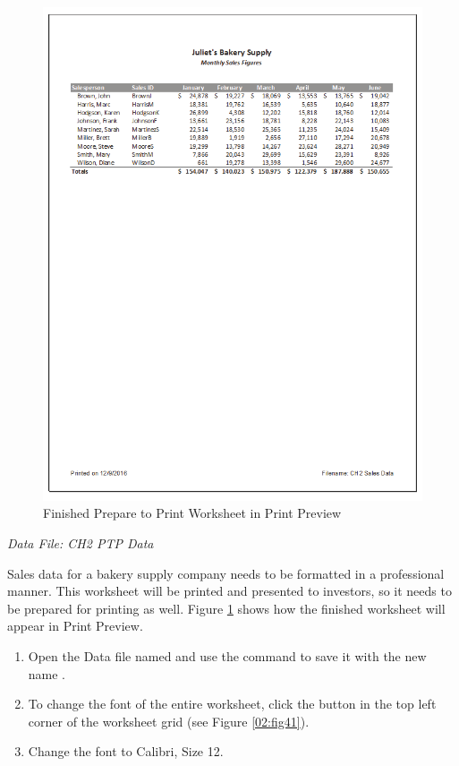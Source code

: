 \begin{figure}[H]
	\centering
	\includegraphics[width=\maxwidth{.95\linewidth}]{gfx/ch02_fig40}
	\caption{Finished Prepare to Print Worksheet in Print Preview}
	\label{02:fig40}
\end{figure}

\textit{Data File: CH2 PTP Data}

Sales data for a bakery supply company needs to be formatted in a professional manner. This worksheet will be printed and presented to investors, so it needs to be prepared for printing as well. Figure \ref{02:fig40} shows how the finished worksheet will appear in Print Preview.

\begin{enumerate}
	\item Open the Data file named  and use the  command to save it with the new name .
	\item To change the font of the entire worksheet, click the  button in the top left corner of the worksheet grid (see Figure \ref{02:fig41}).
	\item Change the font to Calibri, Size 12.
\end{enumerate}

